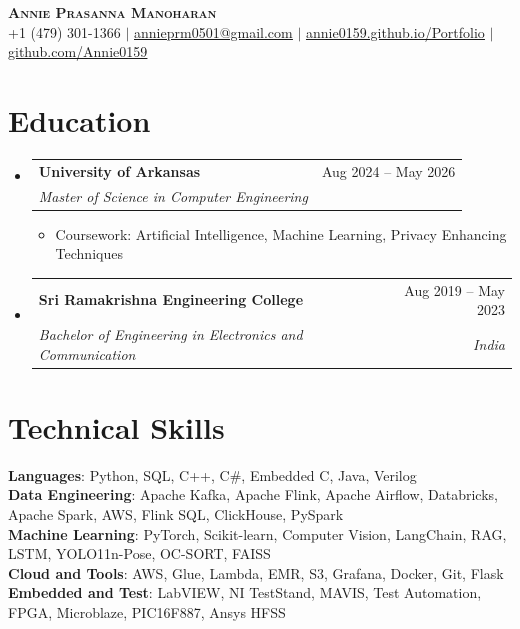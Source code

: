 \documentclass[letterpaper,10pt]{article}
\makeatletter
\newcommand{\resumeSubheading}[4]{
  \vspace{1pt}\item
    \begin{tabular*}{0.985\textwidth}[t]{l@{\extracolsep{\fill}}r}
      \textbf{#1} & #2 \\
      \textit{\small#3} & \textit{\small #4} \\
    \end{tabular*}\vspace{1pt}
}
\newcommand{\resumeItem}[1]{\item\small{#1}}
\newcommand{\resumeSubHeadingListStart}{\begin{itemize}[leftmargin=0.0in, label={}]}
\newcommand{\resumeSubHeadingListEnd}{\end{itemize}\vspace{-2pt}}
\newcommand{\resumeItemListStart}{\begin{itemize}[leftmargin=0.17in]}
\newcommand{\resumeItemListEnd}{\end{itemize}\vspace{2pt}}
\makeatother
\begin{document}

\begin{center}
    \textbf{\Large \scshape Annie Prasanna Manoharan} \\ \vspace{2pt}
    \small +1 (479) 301-1366 $|$ \href{mailto:annieprm0501@gmail.com}{\underline{annieprm0501@gmail.com}} $|$ \href{https://annie0159.github.io/Portfolio/}{\underline{annie0159.github.io/Portfolio}} $|$ \href{https://github.com/Annie0159}{\underline{github.com/Annie0159}}
\end{center}

\section{Education}
  \resumeSubHeadingListStart
    \resumeSubheading
      {University of Arkansas}{Aug 2024 -- May 2026}
      {Master of Science in Computer Engineering}{}
      \resumeItemListStart
        \resumeItem{Coursework: Artificial Intelligence, Machine Learning, Privacy Enhancing Techniques}
      \resumeItemListEnd
    \resumeSubheading
      {Sri Ramakrishna Engineering College}{Aug 2019 -- May 2023}
      {Bachelor of Engineering in Electronics and Communication}{India}
  \resumeSubHeadingListEnd

\section{Technical Skills}
 \begin{itemize}[leftmargin=0.15in, label={}]
    \small{\item{
     \textbf{Languages}{: Python, SQL, C++, C\#, Embedded C, Java, Verilog} \\
     \textbf{Data Engineering}{: Apache Kafka, Apache Flink, Apache Airflow, Databricks, Apache Spark, AWS, Flink SQL, ClickHouse, PySpark} \\
     \textbf{Machine Learning}{: PyTorch, Scikit-learn, Computer Vision, LangChain, RAG, LSTM, YOLO11n-Pose, OC-SORT, FAISS} \\
     \textbf{Cloud and Tools}{: AWS, Glue, Lambda, EMR, S3, Grafana, Docker, Git, Flask} \\
     \textbf{Embedded and Test}{: LabVIEW, NI TestStand, MAVIS, Test Automation, FPGA, Microblaze, PIC16F887, Ansys HFSS} \\
    }}
 \end{itemize}
\end{document}
